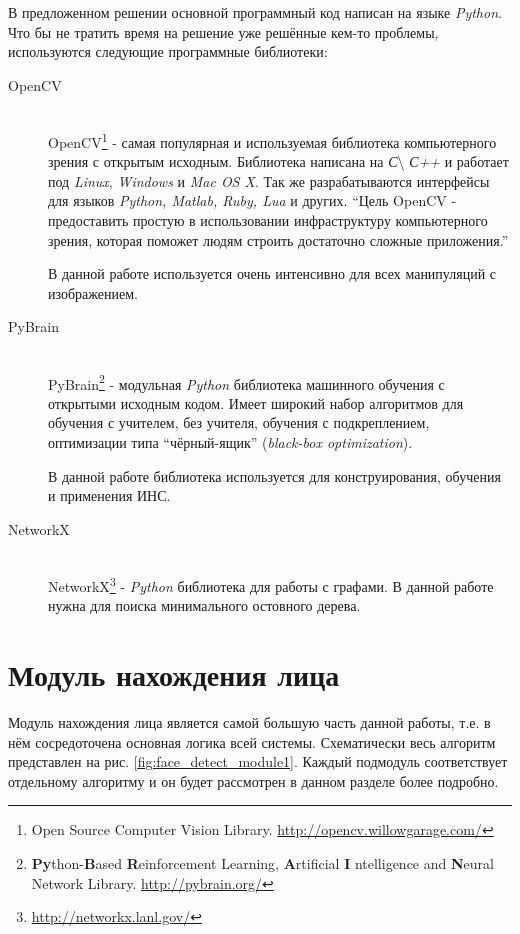 \documentclass[12pt]{report}
\begin{document}
В предложенном решении основной программный код написан на языке \textit{Python}. Что бы не тратить время на решение 
уже решённые кем-то проблемы, используются следующие программные библиотеки:
\begin{description}

\item[OpenCV]\hfill \\
	OpenCV\footnote{Open Source Computer Vision Library. \url{http://opencv.willowgarage.com/}} - самая популярная и 
используемая библиотека компьютерного зрения с открытым исходным. Библиотека написана на \textit{С}\textbackslash{}
\textit{С++} и работает под \textit{Linux}, \textit{Windows} и \textit{Mac OS X}. Так же разрабатываются интерфейсы 
для языков \textit{Python, Matlab, Ruby, Lua} и других. ``Цель OpenCV - предоставить простую в использовании 
инфраструктуру компьютерного зрения, которая поможет людям строить достаточно сложные приложения.'' \citep
{bradski2008learning}
	
В данной работе используется очень интенсивно для всех манипуляций с изображением.

\item[PyBrain]\hfill \\
	PyBrain\footnote{\textbf{Py}thon-\textbf{B}ased \textbf{R}einforcement Learning, \textbf{A}rtificial \textbf{I}
ntelligence and \textbf{N}eural Network Library. \url{http://pybrain.org/}} - модульная \textit{Python} библиотека 
машинного обучения с открытыми исходным кодом. Имеет широкий набор алгоритмов для обучения с учителем, без учителя, 
обучения с подкреплением, оптимизации типа ``чёрный-ящик'' (\textit{black-box optimization}).
	
В данной работе библиотека используется для конструирования, обучения и применения ИНС.

\item[NetworkX]\hfill \\
NetworkX\footnote{\url{http://networkx.lanl.gov/}} - \textit{Python} библиотека для работы с графами. В данной работе 
нужна для поиска минимального остовного дерева.

\end{description}

\section{Модуль нахождения лица}

Модуль нахождения лица является самой большую часть данной работы, т.е. в нём сосредоточена основная логика всей 
системы. Схематически весь алгоритм представлен на рис. \ref{fig:face_detect_module1}. Каждый подмодуль соответствует 
отдельному алгоритму и он будет рассмотрен в данном разделе более подробно. %
\end{document}
